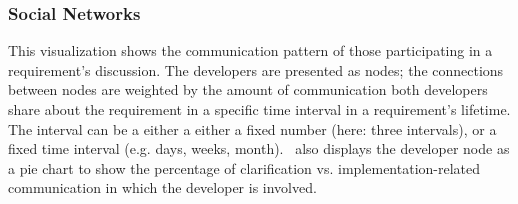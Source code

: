 \subsubsection{Social Networks} 
This visualization shows the communication pattern of those participating in a requirement's discussion. 
The developers are presented as nodes; the connections between nodes are weighted by the amount of communication both developers share about the requirement in a specific time interval in a requirement's lifetime. 
The interval can be a either a either a fixed number (here: three intervals), or a fixed time interval (e.g. days, weeks, month). 
\viss\ also displays the developer node as a pie chart to show the percentage of clarification vs. implementation-related communication in which the developer is involved.





